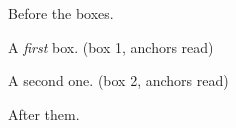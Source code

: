 Before the boxes.

A \emph{first} box. (box 1, anchors read)

A second one. (box 2, anchors read)

After them.%
